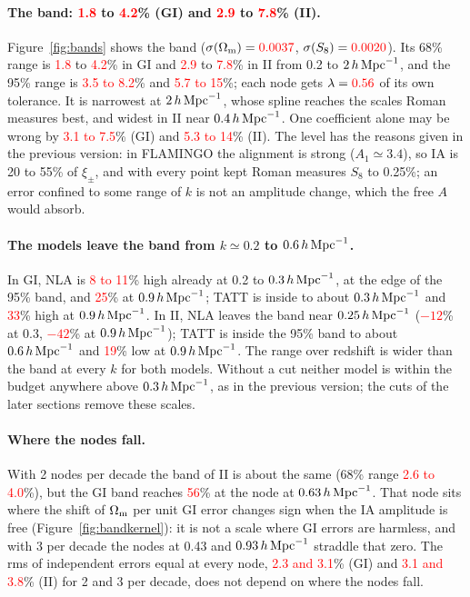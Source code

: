 \documentclass[11pt]{article}
\newcommand{\hMpc}{\,h\,{\rm Mpc}^{-1}}
\newcommand{\Om}{\Omega_{\rm m}}
\newif\ifnumbersfinal
\newcommand{\refresh}[1]{\ifnumbersfinal#1\else\textcolor{red}{#1}\fi}
\newcommand{\SplSigOm}{\refresh{0.0037}}
\newcommand{\SplSigS}{\refresh{0.0020}}
\newcommand{\SplBandGILo}{\refresh{1.8}}
\newcommand{\SplBandGIHi}{\refresh{4.2}}
\newcommand{\SplBandIILo}{\refresh{2.9}}
\newcommand{\SplBandIIHi}{\refresh{7.8}}
\newcommand{\SplBandGIninefive}{\refresh{3.5 to 8.2}}
\newcommand{\SplBandIIninefive}{\refresh{5.7 to 15}}
\newcommand{\SplLambda}{\refresh{0.56}}
\newcommand{\SplNoCutNodeGIThree}{\refresh{3.1 to 7.5}}
\newcommand{\SplNoCutNodeIIThree}{\refresh{5.3 to 14}}
\newcommand{\SplTwoBandII}{\refresh{2.6 to 4.0}}
\newcommand{\SplOddNode}{\refresh{56}}
\newcommand{\SplNoCutRmsGI}{\refresh{2.3 and 3.1}}
\newcommand{\SplNoCutRmsII}{\refresh{3.1 and 3.8}}
\newcommand{\SplNLAGIlo}{\refresh{8 to 11}}
\newcommand{\SplNLAGIhi}{\refresh{25}}
\newcommand{\SplTATTGIhi}{\refresh{33}}
\newcommand{\SplNLAIIlo}{\refresh{$-12$}}
\newcommand{\SplNLAIIhi}{\refresh{$-42$}}
\newcommand{\SplTATTIIhi}{\refresh{19}}
\begin{document}
\paragraph{The band: \SplBandGILo{} to \SplBandGIHi\% (GI) and \SplBandIILo{} to \SplBandIIHi\% (II).}
Figure~\ref{fig:bands} shows the band ($\sigma(\Om) = \SplSigOm$, $\sigma(S_8)
= \SplSigS$). Its 68\% range is \SplBandGILo{} to \SplBandGIHi\% in GI and
\SplBandIILo{} to \SplBandIIHi\% in II from 0.2 to $2\hMpc$, and the 95\%
range is \SplBandGIninefive\% and \SplBandIIninefive\%; each node gets
$\lambda = \SplLambda$ of its own tolerance. It is narrowest at $2\hMpc$,
whose spline reaches the scales Roman measures best, and widest in II near
$0.4\hMpc$. One coefficient alone may be wrong by \SplNoCutNodeGIThree\% (GI)
and \SplNoCutNodeIIThree\% (II). The level has the reasons given in the
previous version: in FLAMINGO the alignment is strong ($A_1 \simeq 3.4$), so
IA is 20 to 55\% of $\xi_\pm$, and with every point kept Roman measures
$S_8$ to 0.25\%; an error confined to some range of $k$ is not an amplitude
change, which the free $A$ would absorb.

\paragraph{The models leave the band from $k \simeq 0.2$ to $0.6\hMpc$.}
In GI, NLA is \SplNLAGIlo\% high already at 0.2 to $0.3\hMpc$, at the edge of
the 95\% band, and \SplNLAGIhi\% at $0.9\hMpc$; TATT is inside to about
$0.3\hMpc$ and \SplTATTGIhi\% high at $0.9\hMpc$. In II, NLA leaves the band
near $0.25\hMpc$ (\SplNLAIIlo\% at 0.3, \SplNLAIIhi\% at $0.9\hMpc$); TATT is
inside the 95\% band to about $0.6\hMpc$ and \SplTATTIIhi\% low at
$0.9\hMpc$. The range over redshift is wider than the band at every $k$ for
both models. Without a cut neither model is within the budget anywhere above
$0.3\hMpc$, as in the previous version; the cuts of the later sections remove
these scales.

\paragraph{Where the nodes fall.}
With 2 nodes per decade the band of II is about the same (68\% range
\SplTwoBandII\%), but the GI band reaches \SplOddNode\% at the node at
$0.63\hMpc$. That node sits where the shift of $\Om$ per unit GI error
changes sign when the IA amplitude is free (Figure~\ref{fig:bandkernel}): it
is not a scale where GI errors are harmless, and with 3 per decade the nodes
at 0.43 and $0.93\hMpc$ straddle that zero. The rms of independent errors
equal at every node, \SplNoCutRmsGI\% (GI) and \SplNoCutRmsII\% (II) for 2
and 3 per decade, does not depend on where the nodes fall.
\end{document}
